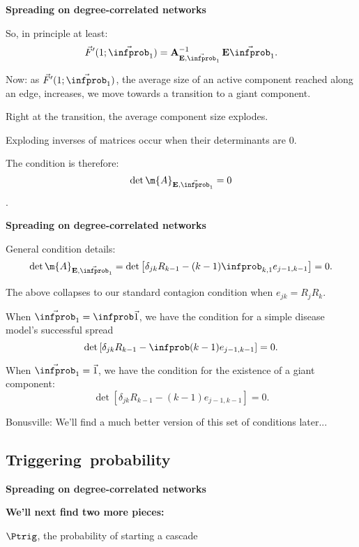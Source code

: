   \textbf{Spreading on degree-correlated networks}

  
  
    So, in principle at least:
    $$
    \vec{F}'(1;\vec{\infprob}_1)
    =
    \mathbf{A}_{\mathbf{E},\vec{\infprob}_1 }^{-1}
    \, \mathbf{E} \vec{\infprob}_1.
    $$
  
    Now: as $\vec{F}'(1;\vec{\infprob}_1)$, 
    the average size of an active component
    reached along an edge, increases, we move towards
    a transition to a giant component.
  
    Right at the transition, the average component
    size explodes.
  
    Exploding inverses of matrices occur
    when their determinants are 0. 
  
    The condition is therefore: 
    $$\det{\m{A}_{\mathbf{E},\vec{\infprob}_1}} = 0$$.
 


  \textbf{Spreading on degree-correlated networks}

  
   General condition details:
    $$
    \det{\m{A}_{\mathbf{E},\vec{\infprob}_1}}
    =
    \det
    \left[
      \delta_{jk} R_{k-1} 
      -
      (k-1) \infprob_{k,1} e_{j-1,k-1}
    \right] = 0.
    $$
  
    The above collapses to our standard
    contagion condition when $e_{jk} = R_j R_k$.
  
    When $\vec{\infprob}_1=\infprob \vec{1}$, we have the condition
    for a simple disease model's successful spread
    $$
    \det
    \left[
      \delta_{jk} R_{k-1} 
      -
      \infprob (k-1)   e_{j-1,k-1}
    \right] = 0.
    $$
   
    When $\vec{\infprob}_1=\vec{1}$, we have the condition
    for the existence of a giant component:
    $$
    \det
    \left[
      \delta_{jk} R_{k-1} 
      -
      (k-1) e_{j-1,k-1}
    \right] = 0.
    $$
  
    Bonusville: We'll find a much better
    version of this set of conditions later...
  


\subsection{Triggering\ probability}

  \textbf{Spreading on degree-correlated networks}

  \textbf{We'll next find two more pieces:}
    
     
      $\Ptrig$, the probability of starting a cascade
    
